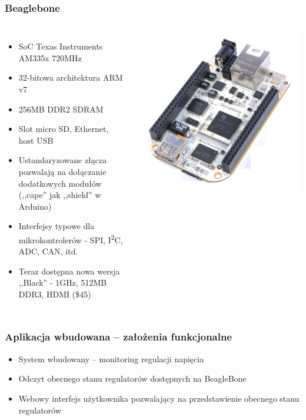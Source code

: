 \documentclass[dvipsnames,table]{beamer}
\begin{document}
\begin{frame}
\frametitle{Beaglebone}

\begin{columns}[c]
\column{3in}

\begin{itemize}

	\item SoC Texas Instruments AM335x 720MHz
	\item 32-bitowa architektura ARM v7
	\item 256MB DDR2 SDRAM
	\item Slot micro SD, Ethernet, host USB
	\item Ustandaryzowane złącza pozwalają na dołączanie dodatkowych modułów (,,cape'' jak ,,shield'' w Arduino)
	\item Interfejsy typowe dla mikrokontrolerów - SPI, I\textsuperscript{2}C, ADC, CAN, itd.
	\item Teraz dostępna nowa wersja ,,Black'' - 1GHz, 512MB DDR3, HDMI (\$45)
\end{itemize}

\column{1.5in}
	\includegraphics[scale=0.5]{img_beaglebone.jpg}
\end{columns}
\end{frame}

\begin{frame}
\frametitle{Aplikacja wbudowana -- założenia funkcjonalne}
\begin{itemize}
	\item System wbudowany -- monitoring regulacji napięcia
	\item Odczyt obecnego stanu regulatorów dostępnych na BeagleBone
	\item Webowy interfejs użytkownika pozwalający na przedstawienie obecnego stanu regulatorów
\end{itemize}
\end{frame}
\end{document}
